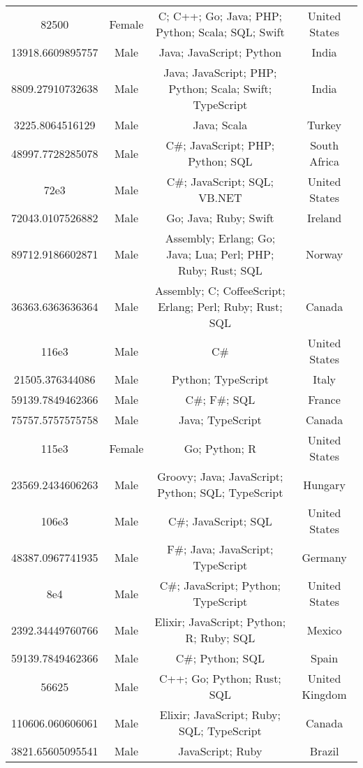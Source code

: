 \begin{center}
\begin{tabular}{ |c|c|c|c| }
82500  &  Female  &  C; C++; Go; Java; PHP; Python; Scala; SQL; Swift  &  United States  \\ 
13918.6609895757  &  Male  &  Java; JavaScript; Python  &  India  \\ 
8809.27910732638  &  Male  &  Java; JavaScript; PHP; Python; Scala; Swift; TypeScript  &  India  \\ 
3225.8064516129  &  Male  &  Java; Scala  &  Turkey  \\ 
48997.7728285078  &  Male  &  C\#; JavaScript; PHP; Python; SQL  &  South Africa  \\ 
72e3  &  Male  &  C\#; JavaScript; SQL; VB.NET  &  United States  \\ 
72043.0107526882  &  Male  &  Go; Java; Ruby; Swift  &  Ireland  \\ 
89712.9186602871  &  Male  &  Assembly; Erlang; Go; Java; Lua; Perl; PHP; Ruby; Rust; SQL  &  Norway  \\ 
36363.6363636364  &  Male  &  Assembly; C; CoffeeScript; Erlang; Perl; Ruby; Rust; SQL  &  Canada  \\ 
116e3  &  Male  &  C\#  &  United States  \\ 
21505.376344086  &  Male  &  Python; TypeScript  &  Italy  \\ 
59139.7849462366  &  Male  &  C\#; F\#; SQL  &  France  \\ 
75757.5757575758  &  Male  &  Java; TypeScript  &  Canada  \\ 
115e3  &  Female  &  Go; Python; R  &  United States  \\ 
23569.2434606263  &  Male  &  Groovy; Java; JavaScript; Python; SQL; TypeScript  &  Hungary  \\ 
106e3  &  Male  &  C\#; JavaScript; SQL  &  United States  \\ 
48387.0967741935  &  Male  &  F\#; Java; JavaScript; TypeScript  &  Germany  \\ 
8e4  &  Male  &  C\#; JavaScript; Python; TypeScript  &  United States  \\ 
2392.34449760766  &  Male  &  Elixir; JavaScript; Python; R; Ruby; SQL  &  Mexico  \\ 
59139.7849462366  &  Male  &  C\#; Python; SQL  &  Spain  \\ 
56625  &  Male  &  C++; Go; Python; Rust; SQL  &  United Kingdom  \\ 
110606.060606061  &  Male  &  Elixir; JavaScript; Ruby; SQL; TypeScript  &  Canada  \\ 
3821.65605095541  &  Male  &  JavaScript; Ruby  &  Brazil  \\ 

\end{tabular}
\end{center}
